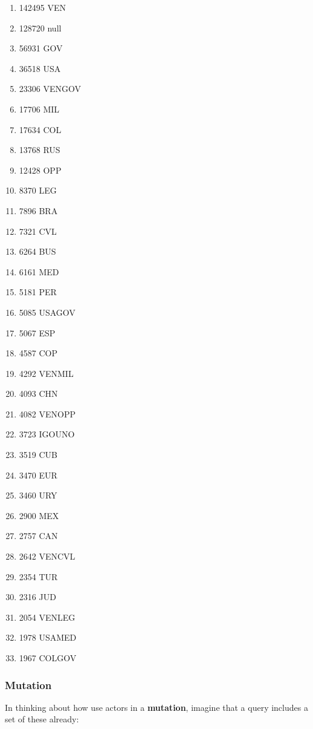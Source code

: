 \begin{enumerate}
\item 142495	\quad VEN
\item 128720	\quad null
\item 56931	\quad GOV
\item 36518	\quad USA
\item 23306	\quad VENGOV
\item 17706	\quad MIL
\item 17634	\quad COL
\item 13768	\quad RUS
\item 12428	\quad OPP
\item 8370		\quad LEG
\item 7896		\quad BRA
\item 7321		\quad CVL
\item 6264		\quad BUS
\item 6161		\quad MED
\item 5181		\quad PER
\item 5085		\quad USAGOV
\item 5067		\quad ESP
\item 4587		\quad COP
\item 4292		\quad VENMIL
\item 4093		\quad CHN
\item 4082		\quad VENOPP
\item 3723		\quad IGOUNO
\item 3519		\quad CUB
\item 3470		\quad EUR
\item 3460		\quad URY
\item 2900		\quad MEX
\item 2757		\quad CAN
\item 2642		\quad VENCVL
\item 2354		\quad TUR
\item 2316		\quad JUD
\item 2054		\quad VENLEG
\item 1978		\quad USAMED
\item 1967		\quad COLGOV
\end{enumerate}

\subsubsection{Mutation} %
In thinking about how use actors in a \textbf{mutation}, %
 imagine that a query includes a set of these already:

